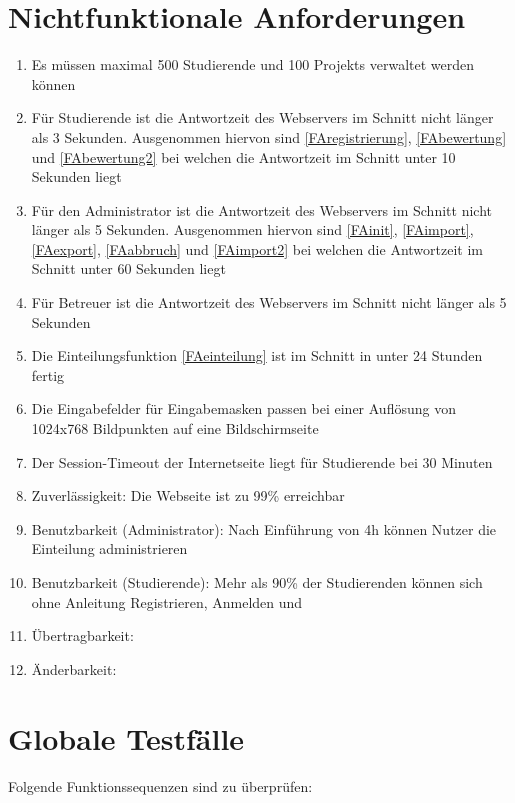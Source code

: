 \documentclass[parskip=full]{scrartcl}
\newcommand{\swtLabel}[1]{\textbf{/#1\arabic*0/}}
\begin{document}
\section{Nichtfunktionale Anforderungen}

\begin{enumerate}[label=\swtLabel{NF}]
  \item Es müssen maximal 500 Studierende und 100 \glspl{Projekt} verwaltet werden
  können
  \item Für Studierende ist die Antwortzeit des Webservers im Schnitt nicht
  länger als 3 Sekunden. Ausgenommen hiervon sind \ref{FAregistrierung}, 
  \ref{FAbewertung} und \ref{FAbewertung2} bei welchen die Antwortzeit im
  Schnitt unter 10 Sekunden liegt
  \item Für den Administrator ist die Antwortzeit des Webservers im Schnitt nicht
  länger als 5 Sekunden. Ausgenommen hiervon sind \ref{FAinit}, \ref{FAimport},
  \ref{FAexport}, \ref{FAabbruch} und \ref{FAimport2} bei welchen die Antwortzeit im Schnitt
  unter 60 Sekunden liegt
  \item Für Betreuer ist die Antwortzeit des Webservers im Schnitt nicht
  länger als 5 Sekunden
  \item Die Einteilungsfunktion \ref{FAeinteilung} ist im Schnitt in unter 24
  Stunden fertig
  \item Die Eingabefelder für Eingabemasken passen bei einer Auflösung von 
	1024x768 Bildpunkten auf eine Bildschirmseite
	\item Der Session-Timeout der Internetseite liegt für Studierende bei 30
	Minuten
	\item Zuverlässigkeit: Die Webseite ist zu 99\% erreichbar %
	\item Benutzbarkeit (Administrator): Nach Einführung von 4h können Nutzer die
	Einteilung administrieren
	\item Benutzbarkeit (Studierende): Mehr als 90\% der Studierenden können
	sich ohne Anleitung Registrieren, Anmelden und %
	\item Übertragbarkeit: %
	\item Änderbarkeit: %
	
 

\end{enumerate}
\section{Globale Testfälle}
Folgende Funktionssequenzen sind zu überprüfen:
\end{document}

